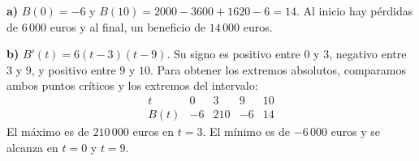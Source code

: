\textbf{a)} $B(0)=-6$ y $B(10)=2000-3600+1620-6=14$. Al inicio hay pérdidas de $6\,000$ euros y al final, un beneficio de $14\,000$ euros.

\textbf{b)} $B'(t)=6(t-3)(t-9)$. Su signo es positivo entre $0$ y $3$, negativo entre $3$ y $9$, y positivo entre $9$ y $10$. Para obtener los extremos absolutos, comparamos ambos puntos críticos y los extremos del intervalo:
\[
\begin{array}{c|rrrr}
t&0&3&9&10\\\hline
B(t)&-6&210&-6&14
\end{array}
\]
El máximo es de $210\,000$ euros en $t=3$. El mínimo es de $-6\,000$ euros y se alcanza en $t=0$ y $t=9$.
